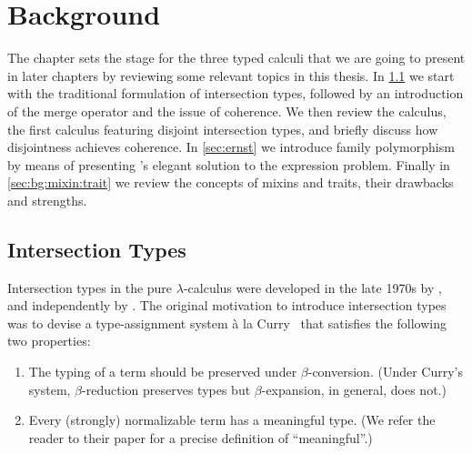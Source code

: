 
\chapter{Background}
\label{chap:background}

The chapter sets the stage for the three typed calculi that we are going to
present in later chapters by reviewing some relevant topics in this thesis. In
\cref{bg:sec:intersection} we start with the traditional formulation of
intersection types, followed by an introduction of the merge operator and the
issue of coherence. We then review the \oname calculus, the first calculus
featuring disjoint intersection types, and briefly discuss how disjointness
achieves coherence. In \cref{sec:ernst} we introduce family polymorphism by
means of presenting \citeauthor{ernst2004expression}'s elegant solution to the expression problem.
Finally in \cref{sec:bg:mixin:trait} we review the concepts of mixins and
traits, their drawbacks and strengths.




\section{Intersection Types}
\label{bg:sec:intersection}


Intersection types in the pure $\lambda$-calculus were developed in the late
1970s by \citet{coppoInter}, and independently by \citet{pottinger1980type}. The
original motivation to introduce intersection types was to devise a
type-assignment system \`a la Curry~\citep{CurryFeys} that satisfies the
following two properties:
\begin{enumerate}
\item The typing of a term should be preserved under $\beta$-conversion. (Under
  Curry's system, $\beta$-reduction preserves types but $\beta$-expansion, in
  general, does not.)
\item Every (strongly) normalizable term has a meaningful type. (We refer the
  reader to their paper for a precise definition of ``meaningful''.)
\end{enumerate}

